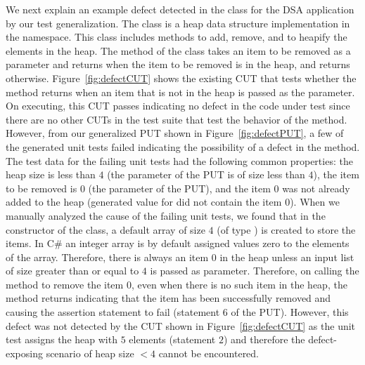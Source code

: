 We next explain an example defect detected in the  class for the DSA application by our test generalization. The  class is a heap data structure implementation in the  namespace. This class includes methods to add, remove, and to heapify the elements in the heap. The  method of the class takes an item to be removed as a parameter and returns  when the item to be removed is in the heap, and returns  otherwise. Figure~\ref{fig:defectCUT} shows the existing CUT that tests whether the  method returns  when an item that is not in the heap is passed as the parameter. On executing, this CUT passes indicating no defect in the code under test since there are no other CUTs in the test suite that test the behavior of the method. However, from our generalized PUT shown in Figure~\ref{fig:defectPUT}, a few of the generated unit tests failed indicating the possibility of a defect in the  method. The test data for the failing unit tests had the following common properties: the heap size is less than $4$ (the  parameter of the PUT is of size less than $4$), the item to be removed is $0$ (the  parameter of the PUT), and the item $0$ was not already added to the heap (generated value for  did not contain the item $0$). When we manually analyzed the cause of the failing unit tests, we found that in the constructor of the  class, a default array of size $4$ (of type ) is created to store the items. In C\# an integer array is by default assigned values zero to the elements of the array. Therefore, there is always an item $0$ in the heap unless an input list of size greater than or equal to $4$ is passed as parameter. Therefore, on calling the  method to remove the item $0$, even when there is no such item in the heap, the method returns  indicating that the item has been successfully removed and causing the assertion statement to fail (statement $6$ of the PUT). However, this defect was not detected by the CUT shown in Figure~\ref{fig:defectCUT} as the unit test assigns the heap with $5$ elements (statement $2$) and therefore the defect-exposing scenario of heap size $< 4$ cannot be encountered. 

